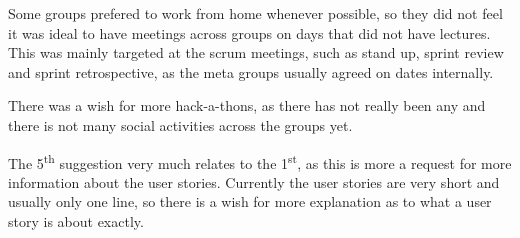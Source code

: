 Some groups prefered to work from home whenever possible, so they did not feel it was ideal to have meetings across groups on days that did not have lectures. 
This was mainly targeted at the scrum meetings, such as stand up, sprint review and sprint retrospective, as the meta groups usually agreed on dates internally.

There was a wish for more hack-a-thons, as there has not really been any and there is not many social activities across the groups yet. 

The 5\textsuperscript{th} suggestion very much relates to the 1\textsuperscript{st}, as this is more a request for more information about the user stories. 
Currently the user stories are very short and usually only one line, so there is a wish for more explanation as to what a user story is about exactly.
